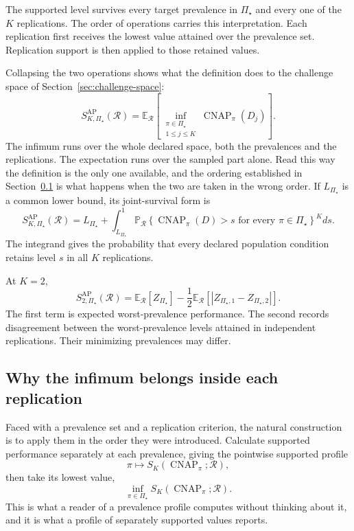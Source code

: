 \documentclass[11pt]{article}
\newcommand{\CNAP}{\operatorname{CNAP}}
\newcommand{\Regime}{\mathcal{R}}
\newcommand{\PSet}{\Pi_\star}
\newcommand{\E}{\mathbb{E}}
\newcommand{\Prb}{\mathbb{P}}
\newcommand{\SRob}{S_{K,\PSet}^{\mathrm{AP}}(\Regime)}
\theoremstyle{remark}
\begin{document}
The supported level survives every target prevalence in $\PSet$ and every one of the $K$ replications. The order of operations carries this interpretation. Each replication first receives the lowest value attained over the prevalence set. Replication support is then applied to those retained values.

Collapsing the two operations shows what the definition does to the challenge space of Section~\ref{sec:challenge-space}:
\[
\SRob
=
\E_{\Regime}
\left[
\inf_{\substack{\pi\in\PSet\\1\leq j\leq K}}
\CNAP_\pi(D_j)
\right].
\]
The infimum runs over the whole declared space, both the prevalences and the replications. The expectation runs over the sampled part alone. Read this way the definition is the only one available, and the ordering established in Section~\ref{sec:infimum-inside} is what happens when the two are taken in the wrong order.
If $L_{\PSet}$ is a common lower bound, its joint-survival form is
\begin{equation}
\SRob
=
L_{\PSet}
+
\int_{L_{\PSet}}^1
\Prb_{\Regime}
\left\{
\CNAP_\pi(D)>s
\text{ for every }\pi\in\PSet
\right\}^{K}
ds.
\label{eq:robust-joint-survival}
\end{equation}
The integrand gives the probability that every declared population condition retains level $s$ in all $K$ replications.

At $K=2$,
\begin{equation}
S_{2,\PSet}^{\mathrm{AP}}(\Regime)
=
\E_{\Regime}[Z_{\PSet}]
-
\frac12
\E_{\Regime}
\left[
|Z_{\PSet,1}-Z_{\PSet,2}|
\right].
\label{eq:robust-k2}
\end{equation}
The first term is expected worst-prevalence performance. The second records disagreement between the worst-prevalence levels attained in independent replications. Their minimizing prevalences may differ.

\subsection{Why the infimum belongs inside each replication}
\label{sec:infimum-inside}

Faced with a prevalence set and a replication criterion, the natural construction is to apply them in the order they were introduced. Calculate supported performance separately at each prevalence, giving the pointwise supported profile
\[
\pi
\longmapsto
S_K(\CNAP_\pi;\Regime),
\]
then take its lowest value,
\[
\inf_{\pi\in\PSet}S_K(\CNAP_\pi;\Regime).
\]
This is what a reader of a prevalence profile computes without thinking about it, and it is what a profile of separately supported values reports.
\end{document}
